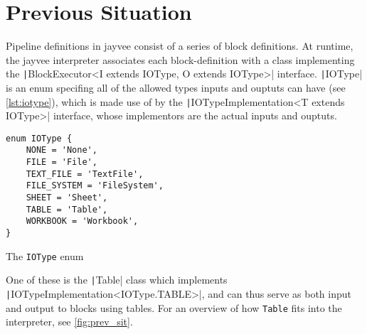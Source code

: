\section{Previous Situation}
\label{section:prev}
Pipeline definitions in jayvee consist of a series of block definitions.
At runtime, the jayvee interpreter associates each block-definition with a class implementing the \texttt|BlockExecutor<I extends IOType, O extends IOType>| interface.
\texttt|IOType| is an enum specifing all of the allowed types inputs and ouptuts can have (see \ref{lst:iotype}), which is made use of by the \texttt|IOTypeImplementation<T extends IOType>| interface, whose implementors are the actual inputs and ouptuts.
\begin{listing}
	\begin{verbatim}
enum IOType {
	NONE = 'None',
	FILE = 'File',
	TEXT_FILE = 'TextFile',
	FILE_SYSTEM = 'FileSystem',
	SHEET = 'Sheet',
	TABLE = 'Table',
	WORKBOOK = 'Workbook',
}
\end{verbatim}
	\caption{The \texttt{IOType} enum}
	\label{lst:iotype}
\end{listing}
One of these is the \texttt|Table| class which implements \texttt|IOTypeImplementation<IOType.TABLE>|, and can thus serve as both input and output to blocks using tables.
For an overview of how \texttt{Table} fits into the interpreter, see \ref{fig:prev_sit}.
